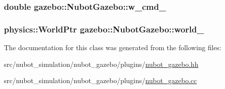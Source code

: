 \hypertarget{classgazebo_1_1NubotGazebo_aebc0851c9ab6da1d1c96d470e72758f8}{
\subsubsection[{w\-\_\-cmd\-\_\-}]{\setlength{\rightskip}{0pt plus 5cm}double gazebo\-::\-Nubot\-Gazebo\-::w\-\_\-cmd\-\_\-\hspace{0.3cm}{\ttfamily [private]}}}\label{classgazebo_1_1NubotGazebo_aebc0851c9ab6da1d1c96d470e72758f8}
\hypertarget{classgazebo_1_1NubotGazebo_aa56e5c10cfbbc981460ab1bcc204d071}{
\subsubsection[{world\-\_\-}]{\setlength{\rightskip}{0pt plus 5cm}physics\-::\-World\-Ptr gazebo\-::\-Nubot\-Gazebo\-::world\-\_\-\hspace{0.3cm}{\ttfamily [private]}}}\label{classgazebo_1_1NubotGazebo_aa56e5c10cfbbc981460ab1bcc204d071}


The documentation for this class was generated from the following files\-:\begin{DoxyCompactItemize}
\item 
src/nubot\-\_\-simulation/nubot\-\_\-gazebo/plugins/\hyperlink{nubot__gazebo_8hh}{nubot\-\_\-gazebo.\-hh}\item 
src/nubot\-\_\-simulation/nubot\-\_\-gazebo/plugins/\hyperlink{nubot__gazebo_8cc}{nubot\-\_\-gazebo.\-cc}\end{DoxyCompactItemize}
